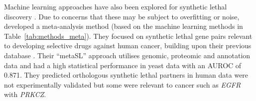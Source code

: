 \begin{table}[!ht]
\caption[Methods used by \citet{Wu2014}]{Machine Learning Methods used by \citet{Wu2014}}
\label{tab:methods_meta}
\end{table}

Machine learning approaches have also been explored for \gls{synthetic lethal} discovery \citep{Babyak2004, Lee2009}. Due to concerns that these may be subject to overfitting or noise, \citet{Wu2014} developed a meta-analysis method (based on the machine learning methods in Table~\ref{tab:methods_meta}). They focused on \gls{synthetic lethal} gene pairs relevant to developing selective drugs against human cancer, building upon their previous database \citep{Li2014}. %
Their ``metaSL'' approach utilises \gls{genomic}, proteomic and annotation data %
and had a high statistical performance in yeast data with an \gls{AUROC} of 0.871. They predicted orthologous \gls{synthetic lethal} partners in human data were not experimentally validated but some were relevant to cancer such as \textit{EGFR} with \textit{PRKCZ}.

